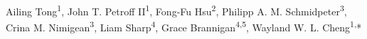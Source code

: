 %
%
%
%
%
Ailing Tong\textsuperscript{1}, John T. Petroff II\textsuperscript{1},
Fong-Fu Hsu\textsuperscript{2}, Philipp A. M.
Schmidpeter\textsuperscript{3}, Crina M. Nimigean\textsuperscript{3},
Liam Sharp\textsuperscript{4}, Grace Brannigan\textsuperscript{4,5},
Wayland W. L. Cheng\textsuperscript{1,}*

